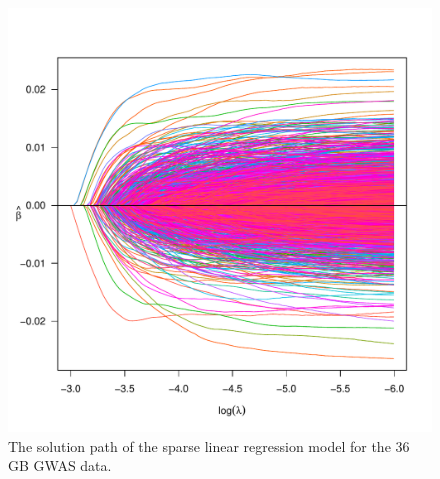 \begin{figure}[ht]
\centering
\includegraphics[scale=0.4]{Figures/Simulated-GWAS-solution-path-linear.pdf}
\caption{The solution path of the sparse linear regression model for the 36 GB GWAS data.}
\label{big_data_linear}
\end{figure}




